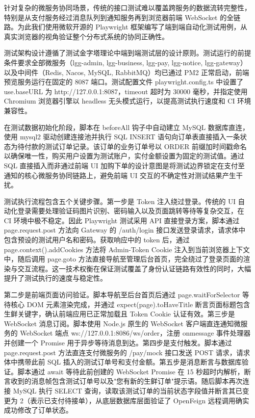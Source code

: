 针对复杂的微服务协同场景，传统的接口测试难以覆盖跨服务的数据流转完整性，特别是从支付服务经过消息队列到通知服务再到浏览器前端 WebSocket 的全链路。为此我们使用微软开源的 Playwright 框架编写了端到端自动化测试用例，从真实浏览器的视角验证整个分布式系统的协同正确性。

测试架构设计遵循了测试金字塔理论中端到端测试层的设计原则。测试运行的前提条件要求全部微服务（lgg-admin, lgg-business, lgg-pay, lgg-notice, lgg-gateway）以及中间件（Redis, Nacos, MySQL, RabbitMQ）均已通过 PM2 正常启动，前端预览服务运行在固定的 8087 端口。测试配置文件 playwright.config.ts 中设置了 use.baseURL 为 http://127.0.0.1:8087，timeout 超时为 30000 毫秒，并指定使用 Chromium 浏览器引擎以 headless 无头模式运行，以提高测试执行速度和 CI 环境兼容性。

在测试数据初始化阶段，脚本在 beforeAll 钩子中自动建立 MySQL 数据库直连，使用 mysql2 驱动创建连接池并执行 SQL INSERT 语句向订单表直接插入一条状态为待付款的测试订单记录。该订单的业务订单号以 ORDER 前缀加时间戳命名以确保唯一性，购买用户设置为测试账户，实付金额设置为固定的测试值。通过 SQL 直接插入而非通过前端 UI 加购下单的设计意图是将测试边界锁定在支付至通知的核心微服务协同链路上，避免前端 UI 交互的不确定性对测试结果产生干扰。

测试执行流程包含五个关键步骤。第一步是 Token 注入绕过登录。传统的 UI 自动化登录需要处理验证码图片识别、密码输入以及页面跳转等待等复杂交互，在 CI 环境中极不稳定。因此 Playwright 测试采用 API 直接登录方案，脚本通过 page.request.post 方法向 Gateway 的 /auth/login 接口发送登录请求，请求体中包含预设的测试用户名和密码。获取响应中的 token 后，通过 page.context().addCookies 方法将 Admin-Token Cookie 注入到当前浏览器上下文中，随后调用 page.goto 方法直接导航至管理后台首页，完全绕过了登录页面的渲染与交互流程。这一技术权衡在保证测试覆盖了身份认证链路有效性的同时，大幅提升了测试执行的速度与稳定性。

第二步是前端页面访问验证。脚本导航至后台首页后通过 page.waitForSelector 等待核心 DOM 元素渲染完成，并通过 expect(page).toHaveTitle 断言页面标题包含生鲜关键字，确认前端应用已正常加载且 Token Cookie 认证有效。第三步是 WebSocket 消息订阅。脚本使用 Node.js 原生的 WebSocket 客户端直连通知微服务的 WebSocket 端点 ws://127.0.0.1:8086/ws/order，注册 onmessage 事件处理器并创建一个 Promise 用于异步等待消息到达。第四步是支付触发。脚本通过 page.request.post 方法直连支付微服务的 /pay/mock 接口发送 POST 请求，请求体中携带此前 SQL 插入的测试订单号和支付金额。第五步是消息断言与数据库验证。脚本通过 await 等待此前创建的 WebSocket Promise 在 15 秒超时内解析，断言收到的消息帧包含测试订单号以及"您有新的生鲜订单"提示语。随后脚本再次连接 MySQL 执行 SELECT 查询，读取该测试订单的当前状态字段值并断言其已变更为 2（表示已支付待接单），从底层数据库层面验证了 OpenFeign 远程调用确实成功修改了订单状态。

